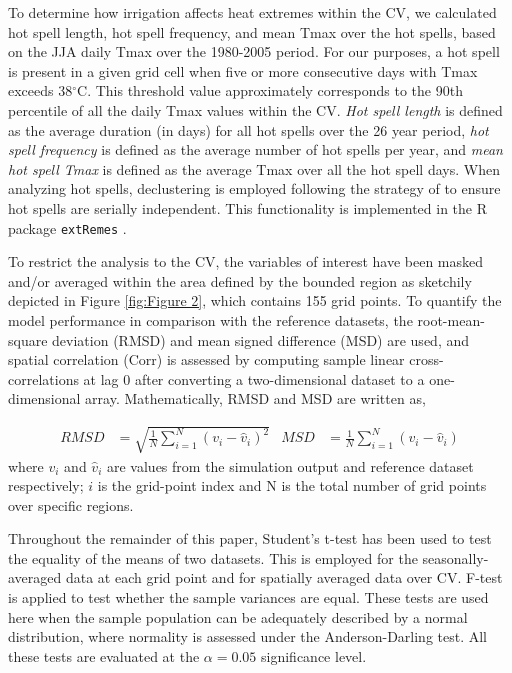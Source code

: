 \documentclass[draft,ms]{agutex}   %
\begin{document}
\begin{article}
To determine how irrigation affects heat extremes within the CV, we calculated hot spell length, hot spell frequency, and mean Tmax over the hot spells, based on the JJA daily Tmax over the 1980-2005 period. For our purposes, a hot spell is present in a given grid cell when five or more consecutive days with Tmax exceeds 38$^\circ$C. This threshold value approximately corresponds to the 90th percentile of all the daily Tmax values within the CV. \textit{Hot spell length} is defined as the average duration (in days) for all  hot spells over the 26 year period, \textit{hot spell frequency} is defined as the average number of hot spells per year, and \textit{mean hot spell Tmax} is defined as the average Tmax over all the hot spell days. When analyzing hot spells, declustering is employed following the strategy of \cite{ferro2003inference} to ensure hot spells are serially independent.  This functionality is implemented in the R package \texttt{extRemes} \citep{gilleland2011new}.

To restrict the analysis to the CV, the variables of interest have been masked and/or averaged within the area defined by the bounded region as sketchily depicted in Figure \ref{fig:Figure 2}, which contains 155 grid points. To quantify the model performance in comparison with the reference datasets, the root-mean-square deviation (RMSD) and mean signed difference (MSD) are used, and spatial correlation (Corr) is assessed by computing sample linear cross-correlations at lag 0 after converting a two-dimensional dataset to a one-dimensional array. Mathematically, RMSD and MSD are written as, 

\begin{align}
RMSD &= \sqrt{\frac{1}{N} \sum_{i=1}^{N} (v_i - \hat{v}_i)^2}  & MSD &= \frac{1}{N} \sum_{i=1}^{N} (v_i - \hat{v}_i) 
\end{align} where $v_i$ and $\hat{v}_i$ are values from the simulation output and reference dataset respectively; $i$ is the grid-point index and N is the total number of grid points over specific regions.

Throughout the remainder of this paper, Student's t-test has been used to test the equality of the means of two datasets. This is employed for the seasonally-averaged data at each grid point and for spatially averaged data over CV. F-test is applied to test whether the sample variances are equal. These tests are used here when the sample population can be adequately described by a normal distribution, where normality is assessed under the Anderson-Darling test. All these tests are evaluated at the $\alpha = 0.05$ significance level. 


\end{article}
\end{document}
